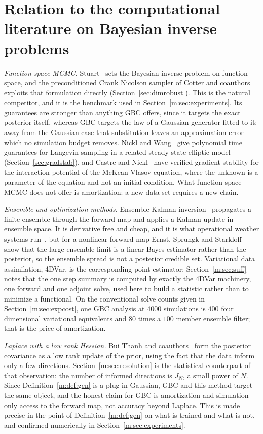 \section{Relation to the computational literature on Bayesian inverse problems}\label{m:sec:related}

\emph{Function space MCMC.} Stuart~\cite{stuart2010} sets the Bayesian inverse problem on function space, and the preconditioned Crank Nicolson sampler of Cotter and coauthors~\cite{cotter2013} exploits that formulation directly (Section~\ref{sec:dimrobust}). This is the natural competitor, and it is the benchmark used in Section~\ref{m:sec:experiments}. Its guarantees are stronger than anything GBC offers, since it targets the exact posterior itself, whereas GBC targets the law of a Gaussian generator fitted to it: away from the Gaussian case that substitution leaves an approximation error which no simulation budget removes. Nickl and Wang~\cite{nicklwang2024} give polynomial time guarantees for Langevin sampling in a related steady state elliptic model (Section~\ref{sec:gradstab}), and Castre and Nickl~\cite{castrenickl2026} have verified gradient stability for the interaction potential of the McKean Vlasov equation, where the unknown is a parameter of the equation and not an initial condition. What function space MCMC does not offer is amortization: a new data set requires a new chain.

\emph{Ensemble and optimization methods.} Ensemble Kalman inversion~\cite{iglesias2013} propagates a finite ensemble through the forward map and applies a Kalman update in ensemble space. It is derivative free and cheap, and it is what operational weather systems run~\cite{houtekamerzhang2016}, but for a nonlinear forward map Ernst, Sprungk and Starkloff~\cite{ernst2015} show that the large ensemble limit is a linear Bayes estimator rather than the posterior, so the ensemble spread is not a posterior credible set. Variational data assimilation, 4DVar, is the corresponding point estimator: Section~\ref{m:sec:suff} notes that the one step summary is computed by exactly the 4DVar machinery, one forward and one adjoint solve, used here to build a statistic rather than to minimize a functional. On the conventional solve counts given in Section~\ref{m:sec:expcost}, one GBC analysis at $4000$ simulations is $400$ four dimensional variational equivalents and $80$ times a $100$ member ensemble filter; that is the price of amortization.

\emph{Laplace with a low rank Hessian.} Bui Thanh and coauthors~\cite{buithanh2013} form the posterior covariance as a low rank update of the prior, using the fact that the data inform only a few directions. Section~\ref{m:sec:resolution} is the statistical counterpart of that observation: the number of informed directions is $J_N$, a small power of $N$. Since Definition~\ref{m:def:gen} is a plug in Gaussian, GBC and this method target the same object, and the honest claim for GBC is amortization and simulation only access to the forward map, not accuracy beyond Laplace. This is made precise in the point of Definition~\ref{m:def:gen} on what is trained and what is not, and confirmed numerically in Section~\ref{m:sec:experiments}.

